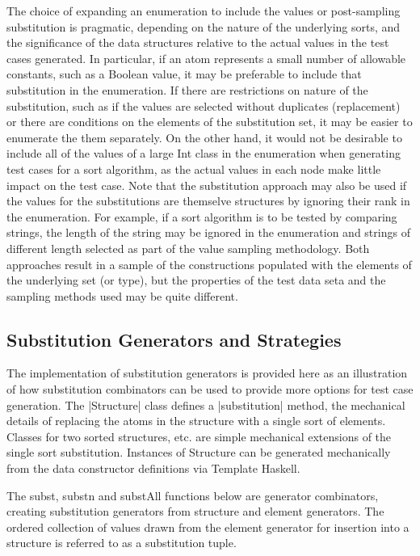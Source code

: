 The choice of expanding an enumeration to include the values
or post-sampling substitution is pragmatic, 
depending on the nature of the underlying sorts,
and the significance of the data structures relative to the actual values in the test cases generated.
In particular,
if an atom represents a small number of allowable constants,
such as a Boolean value,
it may be preferable to include that substitution in the enumeration.
If there are restrictions on nature of the substitution,
such as if the values are selected without duplicates (replacement)
or there are conditions on the elements of the substitution set,
it may be easier to enumerate the them separately.
On the other hand, it would not be desirable to include all of the values of a large Int class
in the enumeration when generating test cases for a sort algorithm,
as the actual values in each node make little impact on the test case.
Note that the substitution approach may also be used if the values for the substitutions
are themselve structures by ignoring their rank in the enumeration.
For example, if a sort algorithm is to be tested by comparing strings,
the length of the string may be ignored in the enumeration and 
strings of different length selected as part of the value sampling methodology.
Both approaches result in a sample of the constructions
populated with the elements of the underlying set (or type),
but the properties of the test data seta
and the sampling methods used may be quite different.

\subsection{Substitution Generators and Strategies}

The \GC implementation of substitution generators is provided here
as an illustration of how substitution combinators can be used
to provide more options for test case generation.
The |Structure| class defines a |substitution| method, the
mechanical details of replacing the atoms in the structure with a single sort of elements.
Classes for two sorted structures, etc. are simple mechanical extensions of the single sort substitution.
Instances of Structure can be generated mechanically from the data constructor
definitions via Template Haskell.

The subst, substn and substAll functions below are generator combinators,
creating substitution generators from structure and element generators.
The ordered collection of values drawn from the element generator for insertion into a structure
is referred to as a substitution tuple.

